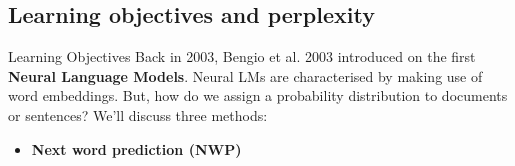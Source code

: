 \documentclass[9pt]{beamer}
\begin{document}
\subsection{Learning objectives and perplexity}
\begin{frame}{Learning Objectives}
    Back in 2003, Bengio et al. 2003 introduced on the first \textbf{Neural Language Models}. %
    Neural LMs are characterised by making use of word embeddings. But, how do we assign a probability distribution to documents or sentences? We'll discuss three methods:
    \begin{itemize}
        \item \textbf{Next word prediction (NWP)}
    \end{itemize}

\end{frame}
\end{document}
